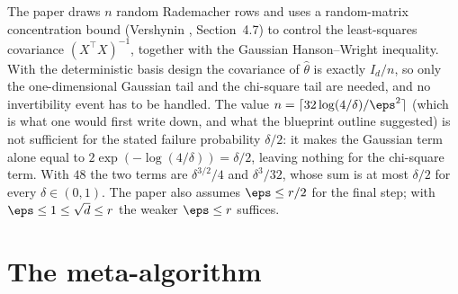 \begin{remark}\label{rem:norm_large_design}
The paper draws $n$ random Rademacher rows and uses a random-matrix concentration bound
(Vershynin \cite{vershynin2018high}, Section~4.7) to control the least-squares covariance
$(X^\top X)^{-1}$, together with the Gaussian Hanson--Wright inequality. With the
deterministic basis design the covariance of $\hat\theta$ is exactly $I_d/n$, so only the
one-dimensional Gaussian tail and the chi-square tail are needed, and no invertibility
event has to be handled. The value $n = \lceil 32\log(4/\delta)/\eps^2\rceil$ (which is what
one would first write down, and what the blueprint outline suggested) is not sufficient
for the stated failure probability $\delta/2$: it makes the Gaussian term alone equal to
$2\exp(-\log(4/\delta)) = \delta/2$, leaving nothing for the chi-square term. With $48$ the
two terms are $\delta^{3/2}/4$ and $\delta^3/32$, whose sum is at most $\delta/2$ for every
$\delta \in (0,1)$. The paper also assumes $\eps \le r/2$
for the final step; with $\eps \le 1 \le \sqrt d \le r$ the weaker $\eps \le r$ suffices.
\end{remark}

\section{The meta-algorithm}
\label{sec:norm_meta}

